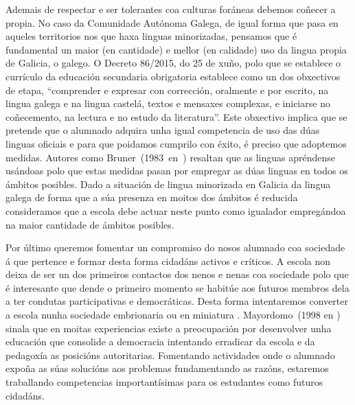 Ademais de respectar e ser tolerantes coa culturas foráneas debemos coñecer a propia. No caso da Comunidade Autónoma Galega, de igual forma que pasa en aqueles territorios nos que haxa linguas minorizadas, pensamos que é fundamental un maior (en cantidade) e mellor (en calidade) uso da lingua propia de Galicia, o galego. O  Decreto 86/2015, do 25 de xuño, polo que se establece o currículo da educación secundaria obrigatoria establece como un dos obxectivos de etapa, ``comprender e expresar con corrección, oralmente e por escrito, na lingua galega e na lingua castelá, textos e mensaxes complexas, e iniciarse no coñecemento, na lectura e no estudo da literatura''. Este obxectivo implica que se pretende que o alumnado adquira unha igual competencia de uso das dúas linguas oficiais e para que poidamos cumprilo con éxito, é preciso que adoptemos medidas. Autores como Bruner~(1983~en~) resaltan que as linguas apréndense usándoas polo que estas medidas pasan por empregar as dúas linguas en todos os ámbitos posibles. Dado a situación de lingua minorizada en Galicia da lingua galega de forma que a súa presenza en moitos dos ámbitos é reducida consideramos que a escola debe actuar neste punto como igualador empregándoa na maior cantidade de ámbitos posibles.

Por último queremos fomentar un compromiso do nosos alumnado coa sociedade á que pertence e formar desta forma cidadáns activos e críticos. A escola non deixa de ser un dos primeiros contactos dos nenos e nenas coa sociedade polo que é interesante que dende o primeiro momento se habitúe aos futuros membros dela a ter condutas participativas e democráticas. Desta forma intentaremos converter a escola nunha sociedade embrionaria ou en miniatura \cite{diazrelaciones}. Mayordomo~(1998 en ) sinala que en moitas experiencias existe a preocupación por desenvolver unha educación que consolide a democracia intentando erradicar da escola e da pedagoxía as posicións autoritarias. Fomentando actividades onde o alumnado expoña as súas solucións aos problemas fundamentando as razóns, estaremos traballando competencias importantísimas para os estudantes como futuros cidadáns.
